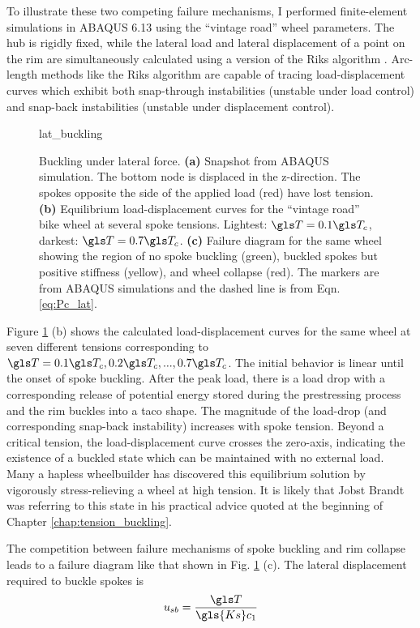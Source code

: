 \documentclass[\rootdir/thesis.tex]{subfiles}
\begin{document}
To illustrate these two competing failure mechanisms, I performed finite-element simulations in ABAQUS 6.13 using the ``vintage road'' wheel parameters. The hub is rigidly fixed, while the lateral load and lateral displacement of a point on the rim are simultaneously calculated using a version of the Riks algorithm \cite{Crisfield1981}. Arc-length methods like the Riks algorithm are capable of tracing load-displacement curves which exhibit both snap-through instabilities (unstable under load control) and snap-back instabilities (unstable under displacement control).

\begin{figure}
\centering
{lat_buckling} 
\caption{Buckling under lateral force. \textbf{(a)} Snapshot from ABAQUS simulation. The bottom node is displaced in the z-direction. The spokes opposite the side of the applied load (red) have lost tension. \textbf{(b)} Equilibrium load-displacement curves for the ``vintage road'' bike wheel at several spoke tensions. Lightest: $\T=0.1\T_c$, darkest: $\T=0.7\T_c$. \textbf{(c)} Failure diagram for the same wheel showing the region of no spoke buckling (green), buckled spokes but positive stiffness (yellow), and wheel collapse (red). The markers are from ABAQUS simulations and the dashed line is from Eqn. \eqref{eq:Pc_lat}.}
\label{fig:lat_buckling}
\end{figure}

Figure \ref{fig:lat_buckling} (b) shows the calculated load-displacement curves for the same wheel at seven different tensions corresponding to $\T=0.1\T_c, 0.2\T_c,...,0.7\T_c$. The initial behavior is linear until the onset of spoke buckling. After the peak load, there is a load drop with a corresponding release of potential energy stored during the prestressing process and the rim buckles into a taco shape. The magnitude of the load-drop (and corresponding snap-back instability) increases with spoke tension. Beyond a critical tension, the load-displacement curve crosses the zero-axis, indicating the existence of a buckled state which can be maintained with no external load. Many a hapless wheelbuilder has discovered this equilibrium solution by vigorously stress-relieving a wheel at high tension. It is likely that Jobst Brandt was referring to this state in his practical advice quoted at the beginning of Chapter \ref{chap:tension_buckling}.

The competition between failure mechanisms of spoke buckling and rim collapse leads to a failure diagram like that shown in Fig. \ref{fig:lat_buckling} (c). The lateral displacement required to buckle spokes is
\begin{equation}
u_{sb} = \frac{\T}{\gls{Ks} c_1}
\end{equation}
\end{document}
